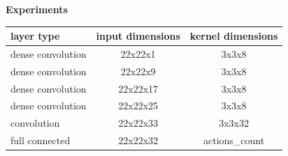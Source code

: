 \documentclass[xcolor=dvipsnames]{beamer}
\begin{document}
\begin{frame}{\bf Experiments}
  \tiny
  {
    \begin{table}[]
    \centering
    \begin{tabular}{|l|c|c|}
    \hline
    \textbf{layer type}                       & \textbf{input dimensions} & \textbf{kernel dimensions} \\ \hline
    \cellcolor[HTML]{0000FB}dense convolution & 22x22x1                   & 3x3x8                      \\ \hline
    \cellcolor[HTML]{0000FB}dense convolution & 22x22x9                  & 3x3x8                      \\ \hline
    \cellcolor[HTML]{0000FB}dense convolution & 22x22x17                  & 3x3x8                      \\ \hline
    \cellcolor[HTML]{0000FB}dense convolution & 22x22x25                  & 3x3x8                      \\ \hline
    \cellcolor[HTML]{67FD9A}convolution       & 22x22x33                  & 3x3x32                     \\ \hline
    \cellcolor[HTML]{FD6864}full connected    & 22x22x32                  & actions\_count             \\ \hline
    \end{tabular}
    \end{table}
  }

\end{frame}
\end{document}

